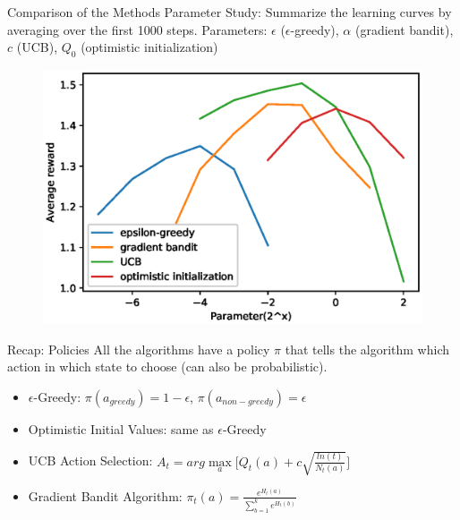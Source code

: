 \documentclass{beamer}
\begin{document}
\begin{frame}{Comparison of the Methods}
Parameter Study: Summarize the learning curves by averaging over the first 1000 steps. Parameters: $\epsilon$ ($\epsilon$-greedy), $\alpha$ (gradient bandit), $c$ (UCB), $Q_0$ (optimistic initialization)
	\begin{figure}
	\centering
	\includegraphics[width=0.85\linewidth]{Images/figure_2_6.eps}\\
	\end{figure}
\end{frame}

\begin{frame}{Recap: Policies}
All the algorithms have a policy $\pi$ that tells the algorithm which action in which state to choose (can also be probabilistic).
\begin{itemize}
\item $\epsilon$-Greedy: $\pi(a_{greedy})=1-\epsilon$, $\pi(a_{non-greedy})=\epsilon$
\item Optimistic Initial Values: same as $\epsilon$-Greedy
\item UCB Action Selection: $A_t = arg \max\limits_{a}  \big[ Q_t (a) + c \sqrt{\frac{ln (t)}{N_t (a)}} \big] $
\item Gradient Bandit Algorithm: $\pi_t (a) = \frac{ e^{H_t (a)} }{  \sum_{b=1}^{k} e^{H_t (b)} } $
\end{itemize}
\end{frame}
\end{document}
